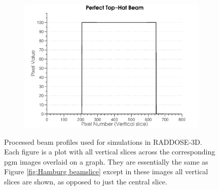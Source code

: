 \begin{figure}
\begin{subfigure}[b]{0.45\textwidth}
                \centering
                \includegraphics[width=\textwidth]{figures/beam/fig_beam_ideal.pdf}
                \caption{}
                \label{figallbeams9}
        \end{subfigure}
        \caption[Processed beam profiles used for simulations in RADDOSE-3D.]{Processed beam profiles used for simulations in RADDOSE-3D.
        Each figure is a plot with all vertical slices across the corresponding pgm images overlaid on a graph.
        They are essentially the same as Figure \ref{fig:Hamburg beamslice} except in these images all vertical slices are shown, as opposed to just the central slice.}
        \label{figallbeamscont}
\end{figure}


